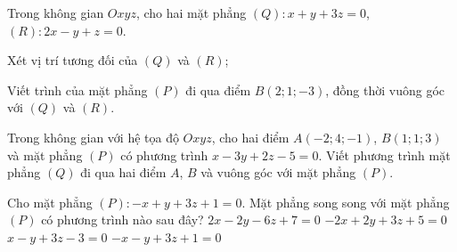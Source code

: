 
\begin{vd}%
	Trong không gian $Oxyz$, cho  hai mặt phẳng $(Q) \colon x+y+3z=0$, $(R) \colon  2x-y+z=0$.
	\begin{enumEX}[a)]{1}
		\item Xét vị trí tương đối của $(Q)$ và $(R)$;
		\item Viết trình của mặt phẳng $(P)$ đi qua điểm $B(2;1;-3)$, đồng thời vuông góc với $(Q)$ và $(R)$.
	\end{enumEX}
\end{vd}
\begin{vd}%
	Trong không gian với hệ tọa độ $Oxyz$, cho hai điểm $A(-2;4;-1)$, $B(1;1;3)$ và mặt phẳng $(P)$ có phương trình $x-3y+2z-5=0$. Viết phương trình mặt phẳng $(Q)$ đi qua hai điểm $A$, $B$ và vuông góc với mặt phẳng $(P)$.
\end{vd}

\baitaptn

\begin{ex}%
	Cho mặt phẳng $(P)\colon -x+y+3z+1=0$. Mặt phẳng song song với mặt phẳng $(P)$ có phương trình nào sau đây?
	\choice
	{\True $2x-2y-6z+7=0$}
	{$-2x+2y+3z+5=0$}
	{$x-y+3z-3=0$}
	{$-x-y+3z+1=0$}
\end{ex}

